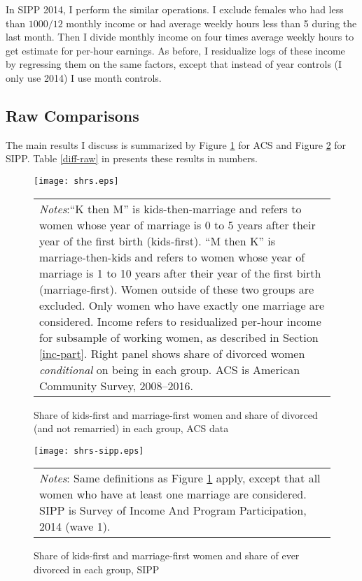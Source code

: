 \documentclass[12pt,letter]{article}
\begin{document}
In SIPP 2014, I perform the similar operations. I exclude females who had less than $1000/12$ monthly income or had average weekly hours less than 5 during the last month. Then I divide monthly income on four times average weekly hours to get estimate for per-hour earnings. As before, I residualize logs of these income by regressing them on the same factors, except that instead of year controls (I only use 2014) I use month controls.

\subsection{Raw Comparisons\label{keycomp}}
The main results I discuss is summarized by Figure \ref{shrs} for ACS and Figure \ref{shrs-sipp} for SIPP. Table \ref{diff-raw} in presents these results in numbers.


\begin{figure}[h!]
\centering
\texttt{[image: shrs.eps]}
\begin{tabular}{ p{\linewidth} }
\footnotesize \emph{Notes}:``K then M'' is kids-then-marriage and refers to women whose year of marriage is 0 to 5 years after their year of the first birth  (kids-first). ``M then K'' is marriage-then-kids and refers to women whose year of marriage is 1 to 10 years after their year of the first birth (marriage-first). Women outside of these two groups are excluded. Only women who have exactly one marriage are considered. Income refers to residualized per-hour income for subsample of working women, as described in Section \ref{inc-part}. Right panel shows share of divorced women \emph{conditional} on being in each group. ACS is American Community Survey, 2008--2016.\\
\end{tabular}
\caption{Share of kids-first and marriage-first women and share of divorced (and not remarried) in each group, ACS data\label{shrs}}
\end{figure}



\begin{figure}[h!]
\centering
\texttt{[image: shrs-sipp.eps]}
\begin{tabular}{ p{\linewidth} }
\footnotesize \emph{Notes}: Same definitions as Figure \ref{shrs} apply, except that all women who have at least one marriage are considered. SIPP is Survey of Income And Program Participation, 2014 (wave 1).\\
\end{tabular}
\caption{Share of kids-first and marriage-first women and share of ever divorced in each group, SIPP\label{shrs-sipp}}
\end{figure}
\end{document}
